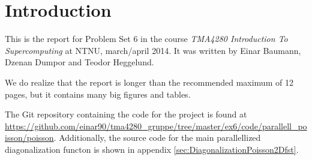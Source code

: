 
\section*{Introduction} %
\label{sec:introduction}
This is the report for Problem Set 6 in the course \emph{TMA4280 Introduction To Supercomputing} at NTNU, march/april 2014. It was written by Einar Baumann, Dzenan Dumpor and Teodor Heggelund.

We do realize that the report is longer than the recommended maximum of 12 pages, but it contains many big figures and tables.

The Git repository containing the code for the project is found at \url{https://github.com/einar90/tma4280_gruppe/tree/master/ex6/code/parallell_poisson/poisson}. Additionally, the source code for the main parallellized diagonalization functon is shown in appendix \ref{sec:DiagonalizationPoisson2Dfst}.
\thispagestyle{empty}
\setcounter{page}{0}
